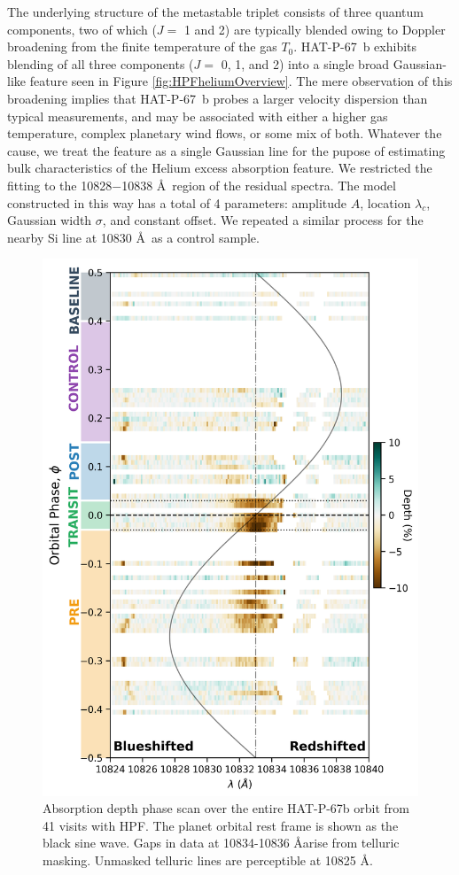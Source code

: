 \documentclass[twocolumn]{aastex631}
\begin{document}
The underlying structure of the metastable  triplet consists of three quantum components, two of which ($J=$ 1 and 2) are typically blended owing to Doppler broadening from the finite temperature of the gas $T_0$.  HAT-P-67~b exhibits blending of all three components ($J=$ 0, 1, and 2) into a single broad Gaussian-like feature seen in Figure \ref{fig:HPFheliumOverview}.  The mere observation of this broadening implies that HAT-P-67~b probes a larger velocity dispersion than typical measurements, and may be associated with either a higher gas temperature, complex planetary wind flows, or some mix of both.  Whatever the cause, we treat the feature as a single Gaussian line for the pupose of estimating bulk characteristics of the Helium excess absorption feature.  We restricted the fitting to the 10828$-$10838 \AA~region of the residual spectra.  The model constructed in this way has a total of 4 parameters: amplitude $A$, location $\lambda_c$, Gaussian width $\sigma$, and constant offset.  We repeated a similar process for the nearby Si line at 10830 \AA~as a control sample.

\begin{figure}
    \includegraphics[width=\linewidth]{figures/phase_2D_diagram_resid.png}
    \caption{Absorption depth phase scan over the entire HAT-P-67b orbit from 41 visits with HPF.  The planet orbital rest frame is shown as the black sine wave. Gaps in data at 10834-10836 \AA arise from telluric masking.  Unmasked telluric lines are perceptible at 10825 \AA.}
    \label{fig:HPFscanResid}
\end{figure}
\end{document}
